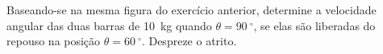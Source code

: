 \item Baseando-se na mesma figura do exercício anterior, determine a velocidade angular das duas barras de \SI{10}{\kilogram} quando $\theta=\SI{90}{^{\circ}}$, se elas são liberadas do repouso na posição $\theta=\SI{60}{^{\circ}}$. Despreze o atrito.